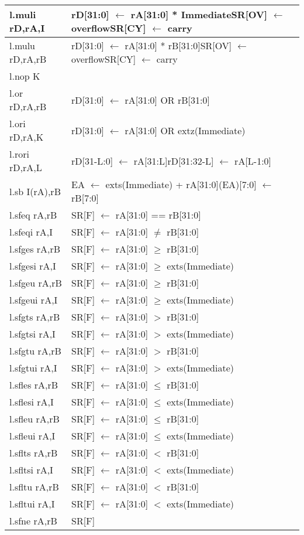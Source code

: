 \begin{longtable}{|p{3cm}|p{10cm}|}
   l.muli rD,rA,I & rD[31:0] $\leftarrow$ rA[31:0] * Immediate\newline SR[OV] $\leftarrow$ overflow\newline SR[CY] $\leftarrow$ carry \\ \hline l.mulu rD,rA,rB & rD[31:0] $\leftarrow$ rA[31:0] * rB[31:0]\newline SR[OV] $\leftarrow$ overflow\newline SR[CY] $\leftarrow$ carry \\ \hline l.nop K & \\ \hline l.or rD,rA,rB & rD[31:0] $\leftarrow$ rA[31:0] OR rB[31:0] \\ \hline l.ori rD,rA,K & rD[31:0] $\leftarrow$ rA[31:0] OR extz(Immediate) \\ \hline l.rori rD,rA,L & rD[31-L:0] $\leftarrow$ rA[31:L]\newline rD[31:32-L] $\leftarrow$ rA[L-1:0] \\ \hline l.sb I(rA),rB & EA $\leftarrow$ exts(Immediate) + rA[31:0]\newline (EA)[7:0] $\leftarrow$ rB[7:0] \\ \hline l.sfeq rA,rB & SR[F] $\leftarrow$ rA[31:0] == rB[31:0] \\ \hline l.sfeqi rA,I & SR[F] $\leftarrow$ rA[31:0] $\ne$ rB[31:0]  \\ \hline l.sfges rA,rB & SR[F] $\leftarrow$ rA[31:0] $\ge$ rB[31:0] \\ \hline l.sfgesi rA,I & SR[F] $\leftarrow$ rA[31:0] $\ge$ exts(Immediate) \\ \hline l.sfgeu rA,rB & SR[F] $\leftarrow$ rA[31:0] $\ge$ rB[31:0] \\ \hline l.sfgeui rA,I & SR[F] $\leftarrow$ rA[31:0] $\ge$ exts(Immediate) \\ \hline l.sfgts rA,rB & SR[F] $\leftarrow$ rA[31:0] $>$ rB[31:0] \\ \hline l.sfgtsi rA,I & SR[F] $\leftarrow$ rA[31:0] $>$ exts(Immediate) \\ \hline l.sfgtu rA,rB & SR[F] $\leftarrow$ rA[31:0] $>$ rB[31:0] \\ \hline l.sfgtui rA,I & SR[F] $\leftarrow$ rA[31:0] $>$ exts(Immediate) \\ \hline l.sfles rA,rB & SR[F] $\leftarrow$ rA[31:0] $\le$ rB[31:0] \\ \hline l.sflesi rA,I & SR[F] $\leftarrow$ rA[31:0] $\le$ exts(Immediate) \\ \hline l.sfleu rA,rB & SR[F] $\leftarrow$ rA[31:0] $\le$ rB[31:0] \\ \hline l.sfleui rA,I & SR[F] $\leftarrow$ rA[31:0] $\le$ exts(Immediate) \\ \hline l.sflts rA,rB & SR[F] $\leftarrow$ rA[31:0] $<$ rB[31:0] \\ \hline l.sfltsi rA,I & SR[F] $\leftarrow$ rA[31:0] $<$ exts(Immediate) \\ \hline l.sfltu rA,rB & SR[F] $\leftarrow$ rA[31:0] $<$ rB[31:0] \\ \hline l.sfltui rA,I & SR[F] $\leftarrow$ rA[31:0] $<$ exts(Immediate) \\ \hline l.sfne rA,rB & SR[F] 
\end{longtable}

